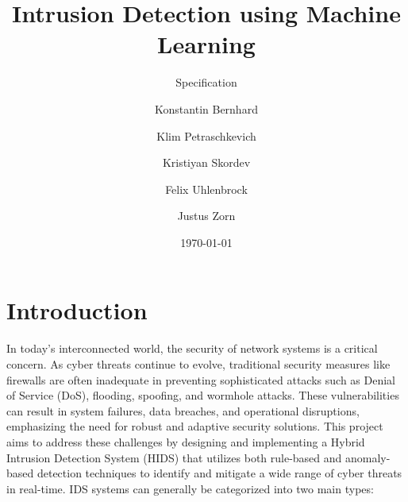 \documentclass[oneside, english]{reports/assets/sdqtechreport}
\author{Konstantin Bernhard \and Klim Petraschkevich \and Kristiyan Skordev \and Felix Uhlenbrock \and Justus Zorn}
\title{Intrusion Detection using Machine Learning}
\subtitle{Specification}
\date{\today}
\begin{document}

\maketitle

\tableofcontents

\cleardoublepage


\chapter{Introduction}
\label{chap:Introduction}

In today’s interconnected world, the security of network systems is a critical
concern. As cyber threats continue to evolve, traditional security measures
like firewalls are often inadequate in preventing sophisticated attacks such as
Denial of Service (DoS), flooding, spoofing, and wormhole attacks. These
vulnerabilities can result in system failures, data breaches, and operational
disruptions, emphasizing the need for robust and adaptive security solutions.
This project aims to address these challenges by designing and implementing a
Hybrid Intrusion Detection System (HIDS) that utilizes both rule-based and
anomaly-based detection techniques to identify and mitigate a wide range of
cyber threats in real-time. IDS systems can generally be categorized into two
main types:
\end{document}
